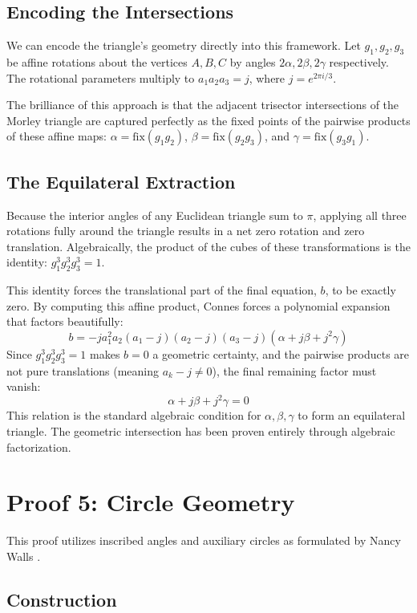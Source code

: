 \documentclass{amsart}
\begin{document}
	\subsection{Encoding the Intersections}
	We can encode the triangle's geometry directly into this framework. Let $g_1, g_2, g_3$ be affine rotations about the vertices $A, B, C$ by angles $2\alpha, 2\beta, 2\gamma$ respectively. The rotational parameters multiply to $a_1 a_2 a_3 = j$, where $j = e^{2\pi i/3}$.
	
	The brilliance of this approach is that the adjacent trisector intersections of the Morley triangle are captured perfectly as the fixed points of the pairwise products of these affine maps: $\alpha = \text{fix}(g_1 g_2)$, $\beta = \text{fix}(g_2 g_3)$, and $\gamma = \text{fix}(g_3 g_1)$.
	
	\subsection{The Equilateral Extraction}
	Because the interior angles of any Euclidean triangle sum to $\pi$, applying all three rotations fully around the triangle results in a net zero rotation and zero translation. Algebraically, the product of the cubes of these transformations is the identity: $g_1^3 g_2^3 g_3^3 = 1$.
	
	This identity forces the translational part of the final equation, $b$, to be exactly zero. By computing this affine product, Connes forces a polynomial expansion that factors beautifully:
	$$b = -j a_1^2 a_2 (a_1 - j)(a_2 - j)(a_3 - j)(\alpha + j\beta + j^2\gamma)$$
	Since $g_1^3 g_2^3 g_3^3 = 1$ makes $b = 0$ a geometric certainty, and the pairwise products are not pure translations (meaning $a_k - j \neq 0$), the final remaining factor must vanish:
	$$\alpha + j\beta + j^2\gamma = 0$$
	This relation is the standard algebraic condition for $\alpha, \beta, \gamma$ to form an equilateral triangle. The geometric intersection has been proven entirely through algebraic factorization.
	
	\section{Proof 5: Circle Geometry}
	
	This proof utilizes inscribed angles and auxiliary circles as formulated by Nancy Walls \cite{walls}.
	
	\subsection{Construction}
	\mbox{} \\ 
	
\end{document}
